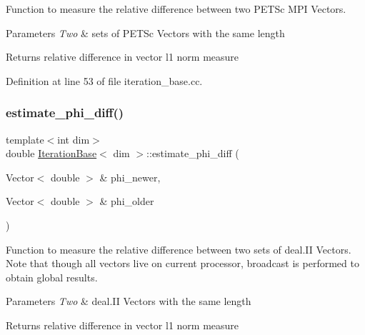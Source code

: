 Function to measure the relative difference between two P\+E\+T\+Sc M\+PI Vectors.


\begin{DoxyParams}{Parameters}
{\em Two} & sets of P\+E\+T\+Sc Vectors with the same length \\
\hline
\end{DoxyParams}
\begin{DoxyReturn}{Returns}
relative difference in vector l1 norm measure 
\end{DoxyReturn}


Definition at line 53 of file iteration\+\_\+base.\+cc.

\mbox{\label{class_iteration_base_ab46bde988ac6dc1b84ebb78665414785}} 
\subsubsection{\texorpdfstring{estimate\+\_\+phi\+\_\+diff()}{estimate\_phi\_diff()}\hspace{0.1cm}{\footnotesize\ttfamily [4/4]}}
{\footnotesize\ttfamily template$<$int dim$>$ \\
double \hyperlink{class_iteration_base}{Iteration\+Base}$<$ dim $>$\+::estimate\+\_\+phi\+\_\+diff (\begin{DoxyParamCaption}\item[{Vector$<$ double $>$ \&}]{phi\+\_\+newer,  }\item[{Vector$<$ double $>$ \&}]{phi\+\_\+older }\end{DoxyParamCaption})\hspace{0.3cm}{\ttfamily [protected]}}

Function to measure the relative difference between two sets of deal.\+II Vectors. Note that though all vectors live on current processor, broadcast is performed to obtain global results.


\begin{DoxyParams}{Parameters}
{\em Two} & deal.\+II Vectors with the same length \\
\hline
\end{DoxyParams}
\begin{DoxyReturn}{Returns}
relative difference in vector l1 norm measure 
\end{DoxyReturn}


